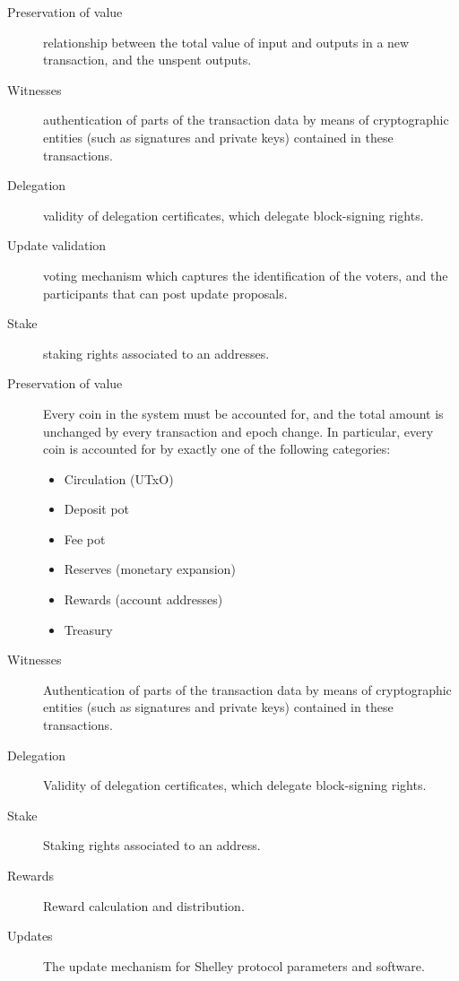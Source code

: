 \begin{description}
\item[Preservation of value] relationship between the total value of input and
  outputs in a new transaction, and the unspent outputs.
\item[Witnesses] authentication of parts of the transaction data by means of
  cryptographic entities (such as signatures and private keys) contained in
  these transactions.
\item[Delegation] validity of delegation certificates, which delegate
  block-signing rights.
\item[Update validation] voting mechanism which captures the identification of
  the voters, and the participants that can post update proposals.
\item[Stake] staking rights associated to an addresses.
\end{description}




\begin{description}
\item[Preservation of value] Every coin in the system must be accounted for,
  and the total amount is unchanged by every transaction and epoch change.
  In particular, every coin is accounted for by exactly one of the following categories:
  \begin{itemize}
    \item Circulation (UTxO)
    \item Deposit pot
    \item Fee pot
    \item Reserves (monetary expansion)
    \item Rewards (account addresses)
    \item Treasury
  \end{itemize}
\item[Witnesses] Authentication of parts of the transaction data by means of
  cryptographic entities (such as signatures and private keys) contained in
  these transactions.
\item[Delegation] Validity of delegation certificates, which delegate
  block-signing rights.
\item[Stake] Staking rights associated to an address.
\item[Rewards] Reward calculation and distribution.
\item[Updates] The update mechanism for Shelley protocol parameters and software.
\end{description}


